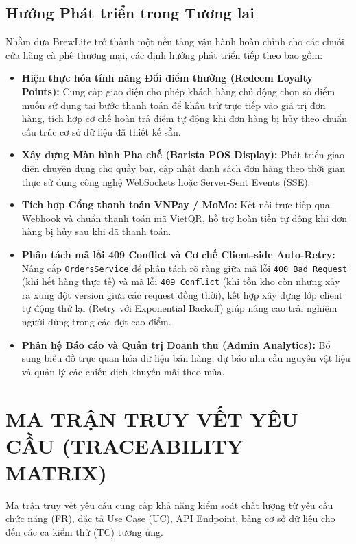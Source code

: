 \documentclass[12pt,a4paper,oneside]{report}
\begin{document}
\section{Hướng Phát triển trong Tương lai}
Nhằm đưa BrewLite trở thành một nền tảng vận hành hoàn chỉnh cho các chuỗi cửa hàng cà phê thương mại, các định hướng phát triển tiếp theo bao gồm:
\begin{itemize}
    \item \textbf{Hiện thực hóa tính năng Đổi điểm thưởng (Redeem Loyalty Points):} Cung cấp giao diện cho phép khách hàng chủ động chọn số điểm muốn sử dụng tại bước thanh toán để khấu trừ trực tiếp vào giá trị đơn hàng, tích hợp cơ chế hoàn trả điểm tự động khi đơn hàng bị hủy theo chuẩn cấu trúc cơ sở dữ liệu đã thiết kế sẵn.
    \item \textbf{Xây dựng Màn hình Pha chế (Barista POS Display):} Phát triển giao diện chuyên dụng cho quầy bar, cập nhật danh sách đơn hàng theo thời gian thực sử dụng công nghệ WebSockets hoặc Server-Sent Events (SSE).
    \item \textbf{Tích hợp Cổng thanh toán VNPay / MoMo:} Kết nối trực tiếp qua Webhook và chuẩn thanh toán mã VietQR, hỗ trợ hoàn tiền tự động khi đơn hàng bị hủy sau khi đã thanh toán.
    \item \textbf{Phân tách mã lỗi 409 Conflict và Cơ chế Client-side Auto-Retry:} Nâng cấp \texttt{OrdersService} để phân tách rõ ràng giữa mã lỗi \texttt{400 Bad Request} (khi hết hàng thực tế) và mã lỗi \texttt{409 Conflict} (khi tồn kho còn nhưng xảy ra xung đột version giữa các request đồng thời), kết hợp xây dựng lớp client tự động thử lại (Retry với Exponential Backoff) giúp nâng cao trải nghiệm người dùng trong các đợt cao điểm.
    \item \textbf{Phân hệ Báo cáo và Quản trị Doanh thu (Admin Analytics):} Bổ sung biểu đồ trực quan hóa dữ liệu bán hàng, dự báo nhu cầu nguyên vật liệu và quản lý các chiến dịch khuyến mãi theo mùa.
\end{itemize}



\appendix

\chapter{MA TRẬN TRUY VẾT YÊU CẦU (TRACEABILITY MATRIX)}
\label{app:traceability-matrix}

Ma trận truy vết yêu cầu cung cấp khả năng kiểm soát chất lượng từ yêu cầu chức năng (FR), đặc tả Use Case (UC), API Endpoint, bảng cơ sở dữ liệu cho đến các ca kiểm thử (TC) tương ứng.
\end{document}
